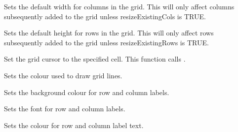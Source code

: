 \label{wxgridsetdefaultcolsize}


Sets the default width for columns in the grid. This will only affect columns subsequently added to
the grid unless resizeExistingCols is TRUE. 

\label{wxgridsetdefaultrowsize}


Sets the default height for rows in the grid. This will only affect rows subsequently added
to the grid unless resizeExistingRows is TRUE.

\label{wxgridsetgridcursor}


Set the grid cursor to the specified cell. 
This function calls .

\label{wxgridsetgridlinecolour}


Sets the colour used to draw grid lines.

\label{wxgridsetlabelbackgroundcolour}


Sets the background colour for row and column labels.

\label{wxgridsetlabelfont}


Sets the font for row and column labels.

\label{wxgridsetlabeltextcolour}


Sets the colour for row and column label text.

\label{wxgridsetreadonly}


